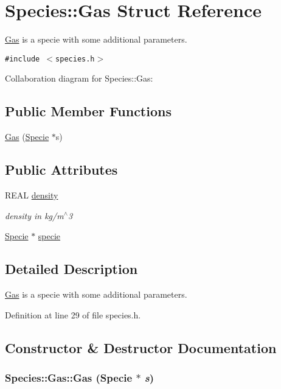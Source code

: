 \hypertarget{structSpecies_1_1Gas}{
\section{Species::Gas Struct Reference}
\label{structSpecies_1_1Gas}
}
\hyperlink{structSpecies_1_1Gas}{Gas} is a specie with some additional parameters.  


{\tt \#include $<$species.h$>$}

Collaboration diagram for Species::Gas:\subsection*{Public Member Functions}
\begin{CompactItemize}
\item 
\hyperlink{structSpecies_1_1Gas_1ab9d04f856eac5e049bd321caa076aa}{Gas} (\hyperlink{classSpecies_1_1Specie}{Specie} $\ast$s)
\end{CompactItemize}
\subsection*{Public Attributes}
\begin{CompactItemize}
\item 
REAL \hyperlink{structSpecies_1_1Gas_f135bbc6200f4e193156fe40e3d5ae21}{density}
\begin{CompactList}\small\item\em density in kg/m$^\wedge$3 \item\end{CompactList}\item 
\hyperlink{classSpecies_1_1Specie}{Specie} $\ast$ \hyperlink{structSpecies_1_1Gas_c4c1880c22066f27bff69e782b23ea24}{specie}
\end{CompactItemize}


\subsection{Detailed Description}
\hyperlink{structSpecies_1_1Gas}{Gas} is a specie with some additional parameters. 

Definition at line 29 of file species.h.

\subsection{Constructor \& Destructor Documentation}
\hypertarget{structSpecies_1_1Gas_1ab9d04f856eac5e049bd321caa076aa}{
\subsubsection[{Gas}]{\setlength{\rightskip}{0pt plus 5cm}Species::Gas::Gas ({\bf Specie} $\ast$ {\em s})}}
\label{structSpecies_1_1Gas_1ab9d04f856eac5e049bd321caa076aa}




